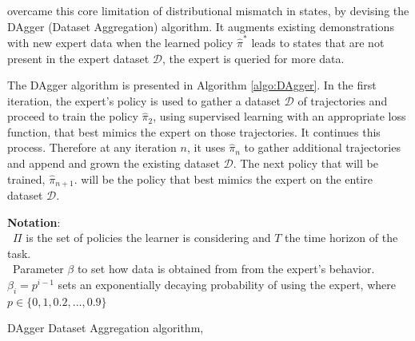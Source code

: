 \documentclass{article}
\begin{document}
\cite{Dagger-Ross2010} overcame this core limitation of distributional mismatch in states, by devising the DAgger (Dataset Aggregation) algorithm. It augments existing demonstrations with new expert data when the learned policy ${\hat{\pi}}^*$ leads to states that are not present in the expert dataset $\mathcal{D}$, the expert is queried for more data.

The DAgger algorithm is presented in Algorithm \ref{algo:DAgger}. In the first iteration, the expert's policy is used to gather a dataset $\mathcal{D}$ of trajectories and proceed to train the policy $\hat{\pi}_2$, using supervised learning with an appropriate loss function, that best mimics the expert on those trajectories. It continues this process. Therefore at any iteration $n$, it uses $\hat{\pi}_n$ to gather additional trajectories and append and grown the existing dataset $\mathcal{D}$. The next policy that will be trained, $\hat{\pi}_{n+1}$. will be the policy that best mimics the expert on the entire dataset $\mathcal{D}$.

\noindent \textbf{Notation}:\\
\textbullet\ \quad $\Pi$ is the set of policies the learner is considering and $T$ the time horizon of the task.\\
\textbullet\ \quad Parameter $\beta$ to set how data is obtained from from the expert's behavior. $\beta_i = p^{i-1}$ sets an exponentially decaying probability of using the expert, where $p \in \{0,1, 0.2, ..., 0.9\}$\\

\begin{algorithm}
	\onehalfspacing
	\caption{DAgger Dataset Aggregation algorithm, \citep{Dagger-Ross2010}}\label{algo:DAgger}
	\begin{algorithmic}[1]
		\EndFor
	\end{algorithmic} 
\end{algorithm}
\end{document}
